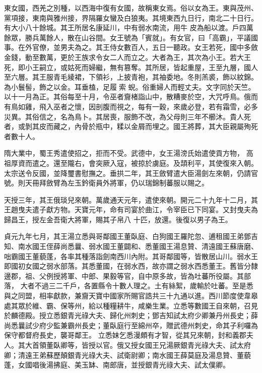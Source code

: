 \begin{pinyinscope}
 東女國，西羌之別種，以西海中復有女國，故稱東女焉。俗以女為王。東與茂州、黨項接，東南與雅州接，界隔羅女蠻及白狼夷。其境東西九日行，南北二十日行。有大小八十餘城。其王所居名康延川，中有弱水南流，用牛
 皮為船以渡。戶四萬餘眾，勝兵萬餘人，散在山谷間。女王號為「賓就」。有女官，曰「高霸」，平議國事。在外官僚，並男夫為之。其王侍女數百人，五日一聽政。女王若死，國中多斂金錢，動至數萬，更於王族求令女二人而立之。大者為王，其次為小王。若大王死，即小王嗣立，或姑死而婦繼，無有篡奪。其所居，皆起重屋，王至九層，國人至六層。其王服青毛綾裙，下領衫，上披青袍，其袖委地。冬則羔裘，飾以紋錦。為小鬟髻，飾之以金。耳垂榼，足履索
 蜺。俗重婦人而輕丈夫。文字同於天竺。以十一月為正。其俗每至十月，令巫者齎楮詣山中，散糟麥於空，大咒呼鳥。俄而有鳥如雞，飛入巫者之懷，因剖腹而視之，每有一穀，來歲必登，若有霜雪，必多災異。其俗信之，名為鳥卜。其居喪，服飾不改，為父母則三年不櫛沐。貴人死者，或剝其皮而藏之，內骨於瓶中，糅以金屑而埋之。國王將葬，其大臣親屬殉死者數十人。



 隋大業中，蜀王秀遣使招之，拒而不受。武德中，女王湯滂氏始遣使貢方物，
 高祖厚資而遣之。還至隴右，會突厥入寇，被掠於虜庭。及頡利平，其使復來入朝。太宗送令反國，並降璽書慰撫之。垂拱二年，其王斂臂遣大臣湯劍左來朝，仍請官號。則天冊拜斂臂為左玉鈐衛員外將軍，仍以瑞錦制蕃服以賜之。



 天授三年，其王俄琰兒來朝。萬歲通天元年，遣使來朝。開元二十九年十二月，其王趙曳夫遣子獻方物。天寶元年，命有司宴於曲江，令宰臣已下同宴。又封曳夫為歸昌王，授左金吾衛大將軍，賜其子帛八
 十匹，放還。後復以男子為王。



 貞元九年七月，其王湯立悉與哥鄰國王董臥庭、白狗國王羅陀忽、逋租國王弟鄧吉知、南水國王侄薛尚悉曩、弱水國王董闢和、悉董國王湯息贊、清遠國王蘇唐磨、咄霸國王董藐蓬，各率其種落詣劍南西川內附。其哥鄰國等，皆散居山川。弱水王即國初女國之弱水部落。其悉董國，在弱水西，故亦謂之弱水西悉董王。舊皆分隸邊郡，祖、父例授將軍、中郎、果毅等官，自中原多故，皆為吐蕃所役屬。其部落，
 大者不過三二千戶，各置縣令十數人理之。土有絲絮，歲輸於吐蕃。至是悉與之同盟，相率獻款，兼齎天寶中國家所賜官誥共三十九通以進。西川節度使韋皋處其眾於維、霸、保等州，給以種糧耕牛，咸樂生業。立悉等數國王自來朝，召見於麟德殿。授立悉銀青光祿大夫、歸化州刺史；鄧吉知試太府少卿兼丹州長史；薛尚悉曩試少府少監兼霸州長史；董臥庭行至綿州卒，贈武德州刺史，命其子利囉為保守都督府長史，襲哥鄰王。
 立悉妹乞悉漫頗有才智，從其兄來朝，封和義郡夫人。其大首領董臥卿等，皆授以官。俄又授女國王兄湯厥銀青光祿大夫、試太府卿；清遠王弟蘇歷顛銀青光祿大夫、試衛尉卿；南水國王薛莫庭及湯息贊、董藐蓬，女國唱後湯拂庭、美玉缽、南郎唐，並授銀青光祿大夫、試太僕卿。




\end{pinyinscope}
